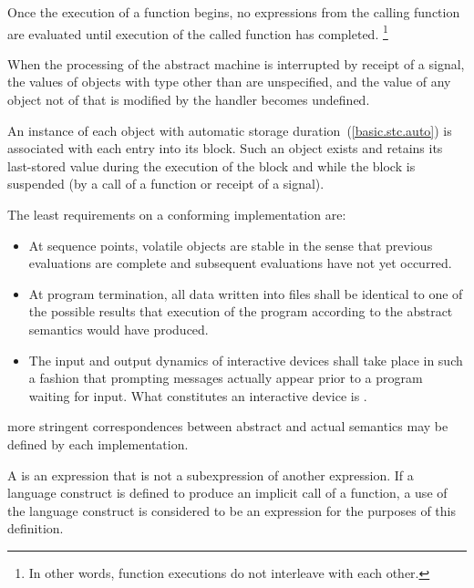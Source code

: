\pnum
Once the execution of a function begins, no expressions from the calling
function are evaluated until execution of the called function has completed.
\footnote{In other words, function executions do not interleave with each other.}

%
%
%
%
\pnum
When the processing of the abstract machine is interrupted by receipt of
a signal, the values of objects with type other than
 are unspecified, and the value of any object
not of  that is modified by the handler becomes
undefined.


\pnum
An instance of each object with automatic storage
duration~(\ref{basic.stc.auto}) is associated with each entry into its
block. Such an object exists and retains its last-stored value during
the execution of the block and while the block is suspended (by a call
of a function or receipt of a signal).

\pnum
The least requirements on a conforming implementation are:

\begin{itemize}

\item
At sequence points, volatile objects are stable in the sense that
previous evaluations are complete and subsequent evaluations have
not yet occurred.

\item
At program termination, all data written into files shall be
identical to one of the possible results that execution of the program
according to the abstract semantics would have produced.

\item
The input and output dynamics of interactive devices shall take
place in such a fashion that prompting messages actually appear prior
to a program waiting for input. What constitutes an interactive device is
.

\end{itemize}

\enternote more stringent correspondences between abstract and actual
semantics may be defined by each implementation. \exitnote

\pnum
{}%
A  is an expression that is not a
subexpression of another expression. If a language construct is defined
to produce an implicit call of a function, a use of the language
construct is considered to be an expression for the purposes of this
definition.

